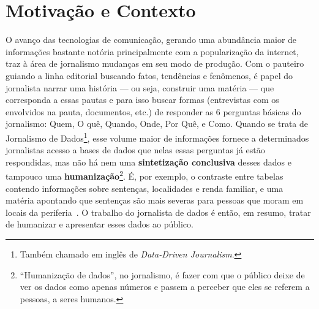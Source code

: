 \section{Motivação e Contexto~\label{sec:Motivação-e-Contexto}}


O avanço das tecnologias de comunicação, gerando uma abundância maior de
informações bastante notória principalmente com a popularização da internet,
traz à área de jornalismo mudanças em seu modo de produção. Com o pauteiro
guiando a linha editorial buscando fatos, tendências e fenômenos, é papel do
jornalista narrar uma história --- ou seja, construir uma matéria ---  que
corresponda a essas pautas e para isso buscar formas (entrevistas com os
envolvidos na pauta, documentos, etc.) de responder as 6 perguntas básicas do
jornalismo: Quem, O quê, Quando, Onde, Por Quê, e Como. Quando se trata de
Jornalismo de Dados\footnote{Também chamado em inglês de \textit{Data-Driven
Journalism}.}, esse volume maior de informações fornece a determinados
jornalistas acesso a bases de dados que nelas essas perguntas já estão
respondidas, mas não há nem uma \textbf{sintetização conclusiva} desses dados e
tampouco uma \textbf{humanização}\footnote{``Humanização de dados'', no
jornalismo, é fazer com que o público deixe de ver os dados como apenas números
e passem a perceber que eles se referem a pessoas, a seres humanos.}. É, por
exemplo, o contraste entre tabelas contendo informações sobre sentenças,
localidades e renda familiar, e uma matéria apontando que sentenças são mais
severas para pessoas que moram em locais da
periferia~\cite{news:sentenças-mais-severas-para-periferia}. O trabalho do
jornalista de dados é então, em resumo, tratar de humanizar e apresentar esses
dados ao público.

